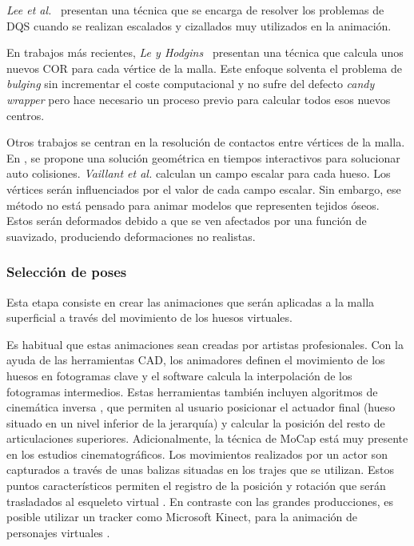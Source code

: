 \emph{Lee et al.}~\cite{Lee2013} presentan una técnica que se encarga de resolver los problemas de \ac{DQS} cuando se realizan escalados y cizallados muy utilizados en la animación.

En trabajos más recientes, \emph{Le y Hodgins}~\cite{le2016real} presentan una técnica que calcula unos nuevos \ac{COR} para cada vértice de la malla. Este enfoque solventa el problema de \emph{bulging} sin incrementar el coste computacional y no sufre del defecto \emph{candy wrapper} pero hace necesario un proceso previo para calcular todos esos nuevos centros.


%
%
Otros trabajos se centran en la resolución de contactos entre vértices de la malla. En \cite{Vaillant:2014}, se propone una solución geométrica  en tiempos interactivos para solucionar auto colisiones. \emph{Vaillant et al.} calculan un campo escalar para cada hueso. Los vértices serán influenciados por el valor de cada campo escalar. Sin embargo, ese método no está pensado para animar modelos que representen tejidos óseos. Estos serán deformados debido a que se ven afectados por una función de suavizado, produciendo deformaciones no realistas. %



\subsubsection{Selección de poses} 
\label{art:poses}
Esta etapa consiste en crear las animaciones que serán aplicadas a la malla superficial a través del movimiento de los huesos virtuales.   

Es habitual que estas animaciones sean creadas por artistas profesionales. Con la ayuda de las herramientas \ac{CAD}, los animadores definen el movimiento de los huesos en fotogramas clave y el software calcula la interpolación de los fotogramas intermedios. Estas herramientas también incluyen algoritmos de cinemática inversa \cite{Shi:2007}, que permiten al usuario posicionar el actuador final (hueso situado en un nivel inferior de la jerarquía) y calcular la posición del resto de articulaciones superiores. 
Adicionalmente, la técnica de \ac{MoCap} está muy presente en los estudios cinematográficos. Los movimientos realizados por un actor son capturados a través de unas balizas situadas en los trajes que se utilizan. Estos puntos característicos permiten el registro de la posición y rotación que serán trasladados al esqueleto virtual \cite{Menache:1999}. En contraste con las grandes producciones, es posible utilizar un \ac{tracker} como Microsoft Kinect, para la animación de personajes virtuales \cite{Liu:2018}.


